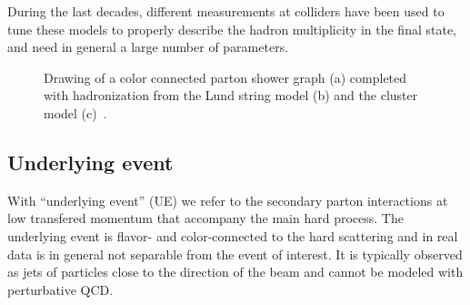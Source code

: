 During the last decades, different measurements at colliders have
been used to tune these models to properly describe 
the hadron multiplicity in the final state,
and need in general a large number of parameters.



\begin{figure}[hbt]\begin{center}
	\caption{Drawing of a color connected parton shower graph (a) completed with hadronization from the Lund string model (b) and the cluster model (c)~\cite{Mangano:933464}.}
\end{center}\end{figure}



\subsection{Underlying event}\label{sec:underlyingevent}

With ``underlying event'' (UE) we refer to the secondary parton interactions 
at low transfered momentum that accompany the main hard process. 
The underlying event is flavor- and color-connected to the hard scattering
and in real data is in general not separable from the event of interest.
It is typically observed as jets of particles close to the direction
of the beam and cannot be modeled with perturbative QCD.

